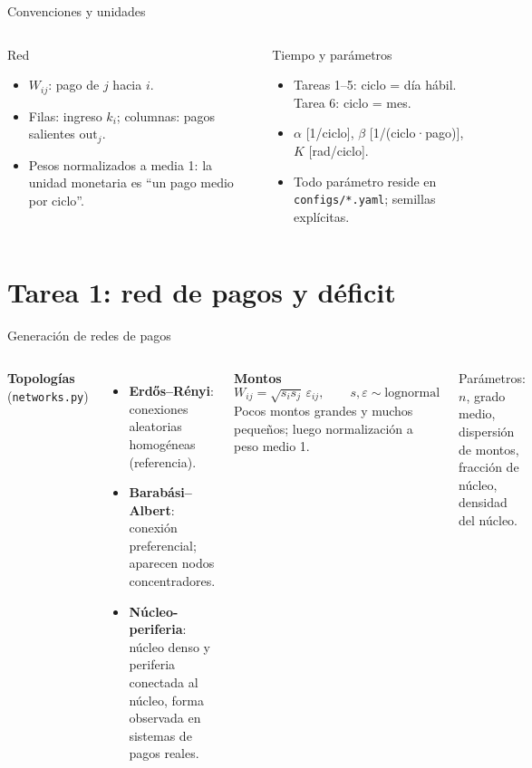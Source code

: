 \documentclass[aspectratio=169,10pt]{beamer}
\begin{document}
\begin{frame}{Convenciones y unidades}
\begin{columns}[T]
\begin{block}{Red}
\begin{itemize}
\item $W_{ij}$: pago de $j$ hacia $i$.
\item Filas: ingreso $k_i$; columnas: pagos salientes $\mathrm{out}_j$.
\item Pesos normalizados a media 1: la unidad monetaria es ``un pago medio por ciclo''.
\end{itemize}
\end{block}
\begin{block}{Tiempo y parámetros}
\begin{itemize}
\item Tareas 1–5: ciclo = día hábil. Tarea 6: ciclo = mes.
\item $\alpha$ [1/ciclo], $\beta$ [1/(ciclo·pago)], $K$ [rad/ciclo].
\item Todo parámetro reside en \texttt{configs/*.yaml}; semillas explícitas.
\end{itemize}
\end{block}
\end{columns}
\end{frame}

\section{Tarea 1: red de pagos y déficit}

\begin{frame}{Generación de redes de pagos}
\begin{columns}[T]
\textbf{Topologías} (\texttt{networks.py})
\begin{itemize}
\item \textbf{Erdős–Rényi}: conexiones aleatorias homogéneas (referencia).
\item \textbf{Barabási–Albert}: conexión preferencial; aparecen nodos concentradores.
\item \textbf{Núcleo-periferia}: núcleo denso y periferia conectada al núcleo, forma
observada en sistemas de pagos reales.
\end{itemize}
\textbf{Montos}
\[
W_{ij} = \sqrt{s_is_j}\,\varepsilon_{ij},\qquad s,\varepsilon\sim\text{lognormal}
\]
\small Pocos montos grandes y muchos pequeños; luego normalización a peso medio 1.
\vspace{0.2cm}

\small Parámetros: $n$, grado medio, dispersión de montos, fracción de núcleo,
densidad del núcleo.
\end{columns}
\end{frame}
\end{document}
